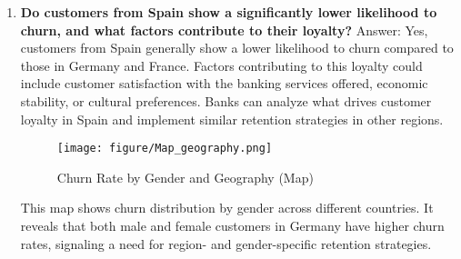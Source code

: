\documentclass[12pt]{article}
\begin{document}
\begin{enumerate}
    \item \textbf{Do customers from Spain show a significantly lower likelihood to churn, and what factors contribute to their loyalty?}
    Answer: Yes, customers from Spain generally show a lower likelihood to churn compared to those in Germany and France. Factors contributing to this loyalty could include customer satisfaction with the banking services offered, economic stability, or cultural preferences. Banks can analyze what drives customer loyalty in Spain and implement similar retention strategies in other regions.

\begin{figure}[h] 
    \centering
    \texttt{[image: figure/Map\_geography.png]} %
    \caption{Churn Rate by Gender and Geography (Map)} %
    \label{fig:map_geography} %
\end{figure}


    This map shows churn distribution by gender across different countries. It reveals that both male and female customers in Germany have higher churn rates, signaling a need for region- and gender-specific retention strategies.
\end{enumerate}

\newpage    
\end{document}
